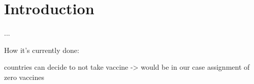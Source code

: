 \section{Introduction}
...

How it's currently done:

countries can decide to not take vaccine -> would be in our case assignment of zero vaccines